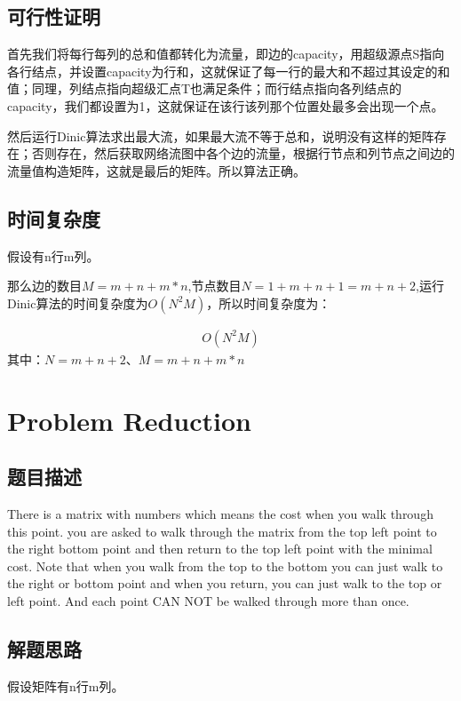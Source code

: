 \documentclass[UTF8,a4paper,12pt]{article}
\begin{document}
\begin{CJK}{UTF8}{gkai}
	\subsection{可行性证明}
		首先我们将每行每列的总和值都转化为流量，即边的capacity，用超级源点S指向各行结点，并设置capacity为行和，这就保证了每一行的最大和不超过其设定的和值；同理，列结点指向超级汇点T也满足条件；而行结点指向各列结点的capacity，我们都设置为1，这就保证在该行该列那个位置处最多会出现一个点。
		
		然后运行Dinic算法求出最大流，如果最大流不等于总和，说明没有这样的矩阵存在；否则存在，然后获取网络流图中各个边的流量，根据行节点和列节点之间边的流量值构造矩阵，这就是最后的矩阵。所以算法正确。
		
	\subsection{时间复杂度}
	假设有n行m列。
	
	那么边的数目$ M=m+n+m*n $,节点数目$ N=1+m+n+1=m+n+2 $,运行Dinic算法的时间复杂度为$ O(N^2M) $，所以时间复杂度为：
	
	\begin{equation*}
	\begin{split}
	O(N^{2}M)
	\end{split}
	\end{equation*}
	其中：$ N=m+n+2 $、$ M=m+n+m*n $



	\newpage
	\section{Problem Reduction}
	\subsection{题目描述}
	There is a matrix with numbers which means the cost when you walk through this point. you are asked to walk through the matrix from the top left point to the right bottom point and then return to the top left point with the minimal cost. Note that when you walk from the top to the bottom you can just walk to the right or bottom point and when you return, you can just walk to the top or left point. And each point CAN NOT be walked through more than once.
	
	\subsection{解题思路}
	假设矩阵有n行m列。
	

\end{CJK}
\end{document}
